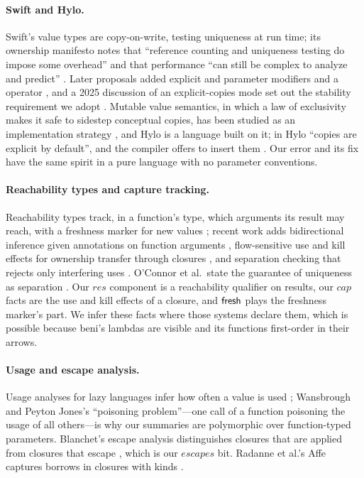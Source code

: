 \paragraph{Swift and Hylo.} Swift's value types are copy-on-write, testing uniqueness at run time; its
ownership manifesto notes that ``reference counting and uniqueness testing do impose some overhead'' and
that performance ``can still be complex to analyze and predict'' \citep{mccall2017manifesto}. Later
proposals added explicit  and  parameter modifiers and a 
operator \citep{swift2022se0377,swift2022se0366}, and a 2025 discussion of an explicit-copies mode set out
the stability requirement we adopt \citep{swift2025explicitcopies}. Mutable value semantics, in which a law of exclusivity makes it safe to sidestep conceptual copies, has been
studied as an implementation strategy \citep{racordon2022mvs}, and Hylo is a language built on it; in Hylo ``copies are explicit by
default'', and the compiler offers to insert them \citep{hylo2024bindings}. Our error and its 
fix have the same spirit in a pure language with no parameter conventions.

\paragraph{Reachability types and capture tracking.} Reachability types track, in a function's type, which
arguments its result may reach, with a freshness marker for new values
\citep{bao2021reachability,wei2024polymorphic}; recent work adds bidirectional inference given annotations
on function arguments \citep{jia2026escape}, flow-sensitive use and kill effects for ownership transfer through
closures \citep{deng2025capture}, and separation checking that rejects only interfering uses
\citep{xu2026capybara}. O'Connor et al.\ state the guarantee of uniqueness as separation
\citep{oconnor2026separation}. Our $\mathit{res}$ component is a reachability qualifier on results, our
$\mathit{cap}$ facts are the use and kill effects of a closure, and $\mathsf{fresh}$ plays the freshness marker's part.
We infer these facts where those systems declare them, which is possible because beni's lambdas are visible
and its functions first-order in their arrows.

\paragraph{Usage and escape analysis.} Usage analyses for lazy languages infer how often a value is used
\citep{turner1995once,wansbrough1999once,wansbrough2002thesis}; Wansbrough and Peyton Jones's ``poisoning
problem''---one call of a function poisoning the usage of all others---is why our summaries are polymorphic
over function-typed parameters. Blanchet's escape analysis distinguishes closures that are applied from
closures that escape \citep{blanchet1998escape}, which is our $\mathit{escapes}$ bit. Radanne et al.'s Affe
captures borrows in closures with kinds \citep{radanne2020kindly}.

